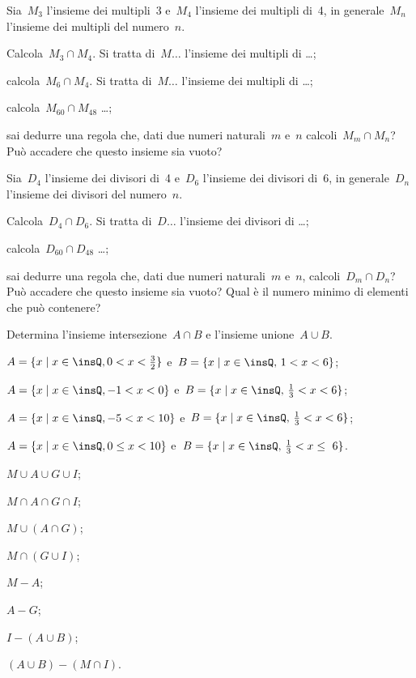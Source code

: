 \begin{esercizio}
\label{ese:\thechapter.100}
Sia~$M_{3}$ l'insieme dei multipli~3 e~$M_{4}$ l'insieme dei multipli di~4, in
generale~$M_{n}$ l'insieme dei multipli del numero~$n$.

 \begin{enumeratea}
 \item Calcola~$M_{3}\cap M_{4}$. Si tratta di~$M\ldots$ l'insieme dei multipli di \ldots;
 \item calcola~$M_{6}\cap M_{4}$. Si tratta di~$M\ldots$ l'insieme dei multipli di \ldots;
 \item calcola~$M_{60}\cap M_{48}$ \ldots;
 \item sai dedurre una regola che, dati due numeri naturali~$m$ e~$n$ calcoli~$M_{m}\cap M_{n}$? Può accadere che questo insieme sia vuoto?
 \end{enumeratea}
\end{esercizio}

\begin{esercizio}
\label{ese:\thechapter.101}
Sia~$D_{4}$ l'insieme dei divisori di~4 e~$D_{6}$ l'insieme dei divisori di~6, in
generale~$D_{n}$ l'insieme dei divisori del numero~$n$.

\begin{enumeratea}
 \item Calcola~$D_{4}\cap D_{6}$. Si tratta di~$D\ldots$ l'insieme dei divisori di \ldots;
 \item calcola~$D_{60}\cap D_{48}$ \ldots;
 \item sai dedurre una regola che, dati due numeri naturali~$m$ e~$n$,
calcoli~$D_{m}\cap D_{n}$? Può accadere che questo insieme sia
vuoto? Qual è il numero minimo di elementi che può contenere?
\end{enumeratea}
\end{esercizio}
\pagebreak
\begin{esercizio} %
\label{ese:\thechapter.102}
Determina l'insieme intersezione~$A\cap B$ e l'insieme unione~$A\cup B$.
\begin{enumeratea}
 \item $A=\{x\mid x\in\insQ,0<x<\frac{3}{2}\}$ e~$B=\{x\mid x\in\insQ\text{, }1<x<6\}$;
 \item $A=\{x\mid x\in\insQ,-1<x<0\}$ e~$B=\{x\mid x\in\insQ\text{, }\frac{1}{3}<x<6\}$;
 \item $A=\{x\mid x\in\insQ,-5<x<10\}$ e~$B=\{x\mid x\in\insQ\text{, }\frac{1}{3}<x<6\}$;
 \item $A=\{x\mid x\in\insQ,0\le x<10\}$ e~$B=\{x\mid x\in\insQ\text{, }\frac{1}{3}<x\le~6\}$.
 \item $M\cup A \cup G \cup I$;
 \item $M\cap A \cap G \cap I$;
 \item $M\cup (A\cap G)$;
 \item $M\cap (G\cup I)$;
 \item $M-A$;
 \item $A-G$;
 \item $I-(A\cup B)$;
 \item $(A\cup B)-(M\cap I)$.
\end{enumeratea}
\end{esercizio}

